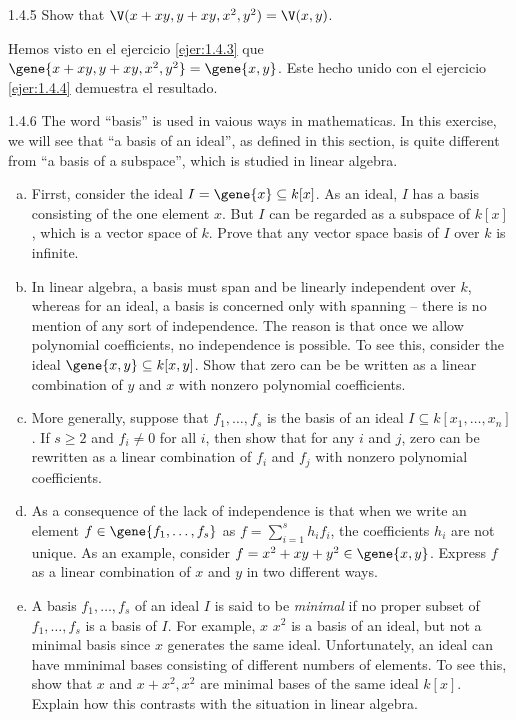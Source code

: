 \documentclass[twoside]{article}
\begin{document}
\newpage

\begin{ejercicio}{1.4.5}
Show that $\V(x+xy,y+xy,x^2,y^2) = \V(x,y)$.
\end{ejercicio}
\begin{solucion}
Hemos visto en el ejercicio \ref{ejer:1.4.3} que $\gene{x+xy,y+xy,x^2,y^2} = \gene{x,y}$.
Este hecho unido con el ejercicio \ref{ejer:1.4.4} demuestra el resultado.
\end{solucion}

\newpage

\begin{ejercicio}{1.4.6}
The word ``basis'' is used in vaious ways in mathematicas.
In this exercise, we will see that ``a basis of an ideal'', as defined in this section, is quite different from ``a basis of a subspace'', which is studied in linear algebra.
\begin{enumerate}[a.]
\item Firrst, consider the ideal $I = \gene{x} \subseteq k[x]$.
As an ideal, $I$ has a basis consisting of the one element $x$.
But $I$ can be regarded as a subspace of $k[x]$, which is a vector space of $k$.
Prove that any vector space basis of $I$ over $k$ is infinite.
\item In linear algebra, a basis must span and be linearly independent over $k$, whereas for an ideal, a basis is concerned only with spanning -- there is no mention of any sort of independence.
The reason is that once we allow polynomial coefficients, no independence is possible.
To see this, consider the ideal $\gene{x,y} \subseteq k[x,y]$.
Show that zero can be be written as a linear combination of $y$ and $x$ with nonzero polynomial coefficients.
\item More generally, suppose that $f_1,\dots,f_s$ is the basis of an ideal $I \subseteq k[x_1,\dots,x_n]$.
If $s ≥ 2$ and $f_i \neq 0$ for all $i$, then show that for any $i$ and $j$, zero can be rewritten as a linear combination of $f_i$ and $f_j$ with nonzero polynomial coefficients.
\item As a consequence of the lack of independence is that when we write an element $f \in \gene{f_1,\dots,f_s}$ as $f = \sum_{i=1}^s h_i f_i$, the coefficients $h_i$ are not unique.
As an example, consider $f = x^2 + xy + y^2 \in \gene{x,y}$.
Express $f$ as a linear combination of $x$ and $y$ in two different ways.
\item A basis $f_1,\dots,f_s$ of an ideal $I$ is said to be \emph{minimal} if no proper subset of $f_1,\dots,f_s$ is a basis of $I$. For example, $x$ $x^2$ is a basis of an ideal, but not a minimal basis since $x$ generates the same ideal.
Unfortunately, an ideal can have mminimal bases consisting of different numbers of elements.
To see this, show that $x$ and $x+x^2,x^2$ are minimal bases of the same ideal $k[x]$. Explain how this contrasts with the situation in linear algebra.
\end{enumerate}
\end{ejercicio}
\end{document}
